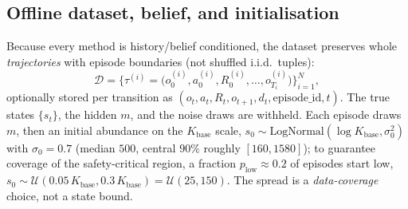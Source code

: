 \documentclass[11pt]{article}
\newcommand{\Kbase}{K_{\mathrm{base}}}
\begin{document}
\subsection{Offline dataset, belief, and initialisation}
Because every method is history/belief conditioned, the dataset preserves whole
\emph{trajectories} with episode boundaries (not shuffled i.i.d.\ tuples):
\begin{equation}
\mathcal{D} = \Big\{\tau^{(i)} = \big(o_0^{(i)},a_0^{(i)},R_0^{(i)},\dots,o^{(i)}_{T_i}\big)\Big\}_{i=1}^{N},
\end{equation}
optionally stored per transition as
$(o_t,a_t,R_t,o_{t+1},d_t,\mathrm{episode\_id},t)$. The true states $\{s_t\}$, the
hidden $m$, and the noise draws are withheld. Each episode draws $m$, then an
initial abundance on the $\Kbase$ scale,
$s_0 \sim \mathrm{LogNormal}(\log\Kbase, \sigma_0^2)$ with $\sigma_0{=}0.7$ (median
$500$, central $90\%$ roughly $[160,1580]$); to guarantee coverage of the
safety-critical region, a fraction $p_{\mathrm{low}}{\approx}0.2$ of episodes
start low, $s_0\sim\mathcal{U}(0.05\,\Kbase, 0.3\,\Kbase)=\mathcal{U}(25,150)$.
The spread is a \emph{data-coverage} choice, not a state bound.
\end{document}
